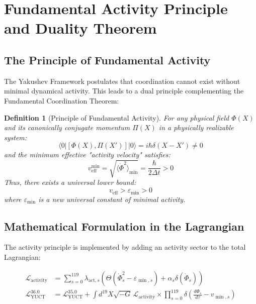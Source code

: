 \documentclass[11pt,a4paper]{article}
\newtheorem{definition}{Definition}
\begin{document}

\section{Fundamental Activity Principle and Duality Theorem}
\label{sec:activity_principle}

\subsection{The Principle of Fundamental Activity}

The Yakushev Framework postulates that coordination cannot exist without minimal dynamical activity. This leads to a dual principle complementing the Fundamental Coordination Theorem:

\begin{definition}[Principle of Fundamental Activity]
	For any physical field $\Phi(X)$ and its canonically conjugate momentum $\Pi(X)$ in a physically realizable system:
	\[
	\langle 0 | [\Phi(X), \Pi(X')] | 0 \rangle = i\hbar\delta(X-X') \neq 0
	\]
	and the minimum effective "activity velocity" satisfies:
	\[
	v_{\mathrm{eff}}^{\min} = \sqrt{\langle \dot{\Phi}^2 \rangle_{\min}} = \frac{\hbar}{2\Delta t} > 0
	\]
	Thus, there exists a universal lower bound:
	\[
	\boxed{v_{\mathrm{eff}} > \varepsilon_{\min} > 0}
	\]
	where $\varepsilon_{\min}$ is a new universal constant of minimal activity.
\end{definition}

\subsection{Mathematical Formulation in the Lagrangian}

The activity principle is implemented by adding an activity sector to the total Lagrangian:

\begin{align}
	\mathcal{L}_{\mathrm{activity}} &= \sum_{s=0}^{119} \lambda_{\mathrm{act},s} \left( \Theta(\dot{\Phi}_s^2 - \varepsilon_{\min,s}) + \alpha_s \delta(\dot{\Phi}_s) \right) \\
	\mathcal{L}_{\mathrm{YUCT}}^{36.0} &= \mathcal{L}_{\mathrm{YUCT}}^{35.0} + \int d^{19}X \sqrt{-G} \, \mathcal{L}_{\mathrm{activity}} \times \prod_{s=0}^{119} \delta\left( \frac{d\Phi_s}{d\tau} - v_{\min,s} \right)
\end{align}
\end{document}
